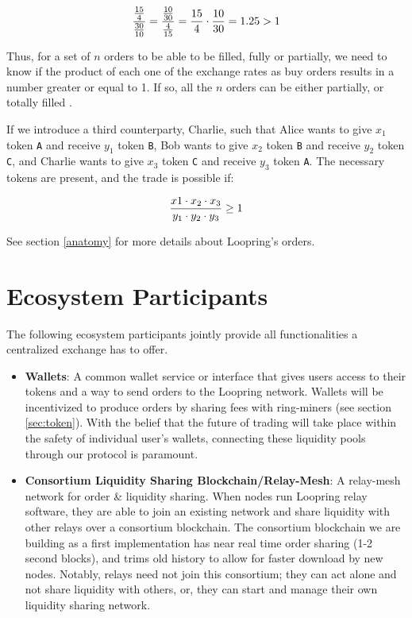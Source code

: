 \documentclass[UTF8,nofonts]{article}
\begin{document}
\begin{multicols}{2}
\begin{equation}
{{15\over 4} \over {30\over 10}} = {{10\over 30} \over {4\over 15}}={15 \over 4} \cdot {10 \over 30} = 1.25 > 1
\end{equation}

Thus, for a set of $n$ orders to be able to be filled, fully or partially, we need to know if the product of each one of the exchange rates as buy orders results in a number greater or equal to 1. If so, all the $n$ orders can be either partially, or totally filled \cite{supersymmetry}.

If we introduce a third counterparty, Charlie, such that  Alice wants to give $x_1$ token \verb|A| and receive $y_1$ token \verb|B|, Bob wants to give $x_2$ token \verb|B| and receive $y_2$ token \verb|C|, and Charlie wants to give $x_3$ token \verb|C| and receive $y_3$ token \verb|A|. The necessary tokens are present, and the trade is possible if:

\begin{equation}
{{x1 \cdot x_2 \cdot x_3 \over y_1 \cdot y_2 \cdot y_3} \geq 1}
\end{equation}


See section \ref{anatomy} for more details about Loopring's orders.



\section{Ecosystem Participants\label{sec:ecosystem}}
The following ecosystem participants jointly provide all functionalities a centralized exchange has to offer. 

\begin{itemize}

\item \textbf{Wallets}: A common wallet service or interface that gives users access to their tokens and a way to send orders to the Loopring network. Wallets will be incentivized to produce orders by sharing fees with ring-miners (see section \ref{sec:token}). With the belief that the future of trading will take place within the safety of individual user's wallets, connecting these liquidity pools through our protocol is paramount.

\item \textbf{Consortium Liquidity Sharing Blockchain/Relay-Mesh}: A relay-mesh network for order \& liquidity sharing. When nodes run Loopring relay software, they are able to join an existing network and share liquidity with other relays over a consortium blockchain. The consortium blockchain we are building as a first implementation has near real time order sharing (1-2 second blocks), and trims old history to allow for faster download by new nodes. Notably, relays need not join this consortium; they can act alone and not share liquidity with others, or, they can start and manage their own liquidity sharing network.


\end{itemize}
\end{multicols}
\end{document}
